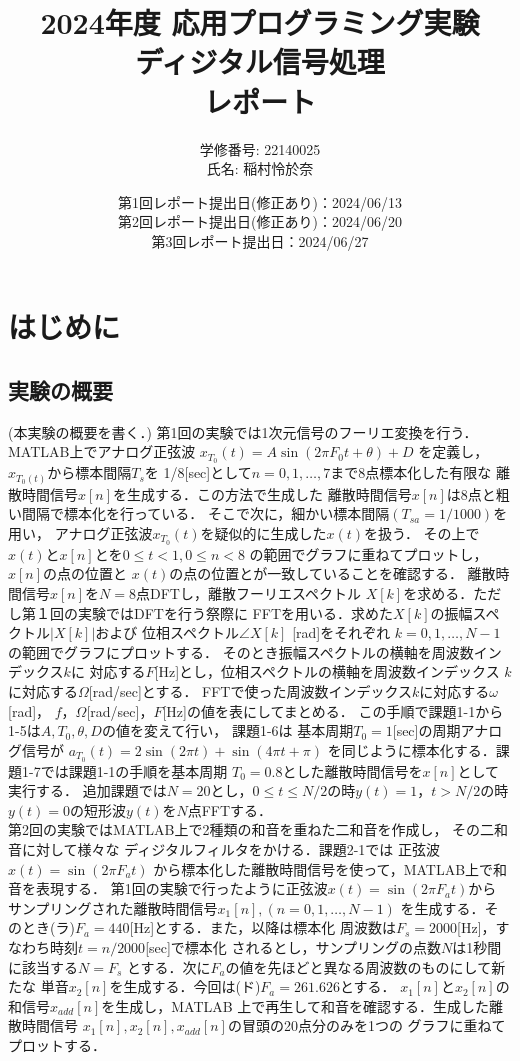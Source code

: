 \documentclass[11pt, a4paper, titlepage]{ltjsarticle}
\title{
2024年度 応用プログラミング実験\\
ディジタル信号処理\\
レポート}
\author{
学修番号: 22140025 \\
氏名: 稲村怜於奈 \\
}
\begin{document}
\date{
第1回レポート提出日(修正あり)：2024/06/13 \\
第2回レポート提出日(修正あり)：2024/06/20 \\
第3回レポート提出日：2024/06/27 \\
}
\maketitle

\section*{はじめに}

\subsection*{実験の概要}
(本実験の概要を書く．)
第1回の実験では1次元信号のフーリエ変換を行う．
MATLAB上でアナログ正弦波
$x_{T_{0}}(t)=A\sin(2\pi F_{0}t+\theta)+ D$
を定義し，$x_{T_{0}(t)}$から標本間隔$T_{s}$を
1/8[sec]として$n=0,1,\dots,7$まで8点標本化した有限な
離散時間信号$x[n]$を生成する．この方法で生成した
離散時間信号$x[n]$は8点と粗い間隔で標本化を行っている．
そこで次に，細かい標本間隔$(T_{sa}=1/1000)$を用い，
アナログ正弦波$x_{T_{0}}(t)$を疑似的に生成した$x(t)$を扱う．
その上で$x(t)$と$x[n]$とを$0\leq t < 1,0 \leq n < 8$
の範囲でグラフに重ねてプロットし，$x[n]$の点の位置と
$x(t)$の点の位置とが一致していることを確認する．
離散時間信号$x[n]$を$N=8$点DFTし，離散フーリエスペクトル
$X[k]$を求める．ただし第１回の実験ではDFTを行う祭際に
FFTを用いる．求めた$X[k]$の振幅スペクトル$|X[k]|$および
位相スペクトル$\angle X[k]$ [rad]をそれぞれ
$k=0,1,\dots ,N-1$の範囲でグラフにプロットする．
そのとき振幅スペクトルの横軸を周波数インデックス$k$に
対応する$F$[Hz]とし，位相スペクトルの横軸を周波数インデックス
$k$に対応する$\Omega$[rad/sec]とする．
FFTで使った周波数インデックス$k$に対応する$\omega$[rad]，
$f$，$\Omega$[rad/sec]，$F$[Hz]の値を表にしてまとめる．
この手順で課題1-1から1-5は$A,T_{0},\theta,D$の値を変えて行い，
課題1-6は 基本周期$T_{0}=1$[sec]の周期アナログ信号が
$a_{T_{0}}(t)=2\sin(2\pi t)+\sin(4\pi t+\pi)$
を同じように標本化する．課題1-7では課題1-1の手順を基本周期
$T_{0}=0.8$とした離散時間信号を$x[n]$として実行する．
追加課題では$N=20$とし，$0\leq t \leq N/2$の時$y(t)=1$，$t>N/2$の時
$y(t)=0$の短形波$y(t)$を$N$点FFTする．\\

第2回の実験ではMATLAB上で2種類の和音を重ねた二和音を作成し，
その二和音に対して様々な
ディジタルフィルタをかける．課題2-1では
正弦波$x(t)=\sin(2\pi F_{a}t)$
から標本化した離散時間信号を使って，MATLAB上で和音を表現する．
第1回の実験で行ったように正弦波$x(t)=\sin(2\pi F_{a}t)$から
サンプリングされた離散時間信号$x_{1}[n],(n=0,1,\dots,N-1)$
を生成する．そのとき(ラ)$F_{a}=440$[Hz]とする．また，以降は標本化
周波数は$F_{s}=2000$[Hz]，すなわち時刻$t=n/2000$[sec]で標本化
されるとし，サンプリングの点数$N$は1秒間に該当する$N=F_{s}$
とする．次に$F_{a}$の値を先ほどと異なる周波数のものにして新たな
単音$x_{2}[n]$を生成する．今回は(ド)$F_{a}=261.626$とする．
$x_{1}[n]$と$x_{2}[n]$の和信号$x_{add}[n]$を生成し，MATLAB
上で再生して和音を確認する．生成した離散時間信号
$x_{1}[n],x_{2}[n],x_{add}[n]$の冒頭の20点分のみを1つの
グラフに重ねてプロットする．
\end{document}
